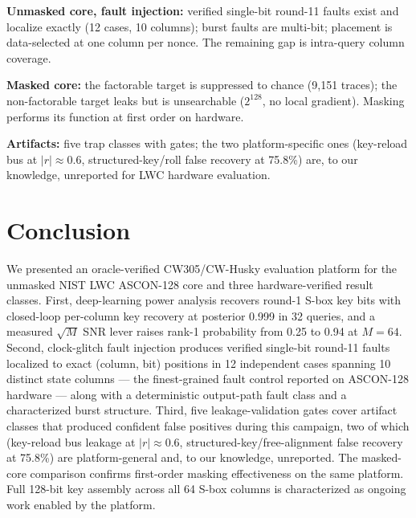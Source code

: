 \documentclass[conference]{IEEEtran}
\begin{document}
\textbf{Unmasked core, fault injection:} verified single-bit
round-11 faults exist and localize exactly (12 cases, 10
columns); burst faults are multi-bit; placement is
data-selected at one column per nonce. The remaining gap is
intra-query column coverage.

\textbf{Masked core:} the factorable target is suppressed to
chance (9{,}151 traces); the non-factorable target leaks but is
unsearchable ($2^{128}$, no local gradient). Masking performs
its function at first order on hardware.

\textbf{Artifacts:} five trap classes with gates; the two
platform-specific ones (key-reload bus at $|r|\approx0.6$,
structured-key/roll false recovery at 75.8\%) are, to our
knowledge, unreported for LWC hardware evaluation.

\section{Conclusion}
\label{sec:conclusion}

We presented an oracle-verified CW305/CW-Husky evaluation
platform for the unmasked NIST LWC ASCON-128 core and three
hardware-verified result classes. First, deep-learning power
analysis recovers round-1 S-box key bits with closed-loop
per-column key recovery at posterior 0.999 in 32 queries, and a
measured $\sqrt{M}$ SNR lever raises rank-1 probability from
0.25 to 0.94 at $M\!=\!64$. Second, clock-glitch fault
injection produces verified single-bit round-11 faults
localized to exact (column, bit) positions in 12 independent
cases spanning 10 distinct state columns — the finest-grained
fault control reported on ASCON-128 hardware — along with a
deterministic output-path fault class and a characterized burst
structure. Third, five leakage-validation gates cover artifact
classes that produced confident false positives during this
campaign, two of which (key-reload bus leakage at
$|r|\approx0.6$, structured-key/free-alignment false recovery
at 75.8\%) are platform-general and, to our knowledge,
unreported. The masked-core comparison confirms first-order
masking effectiveness on the same platform. Full 128-bit key
assembly across all 64 S-box columns is characterized as
ongoing work enabled by the platform.

\end{document}
